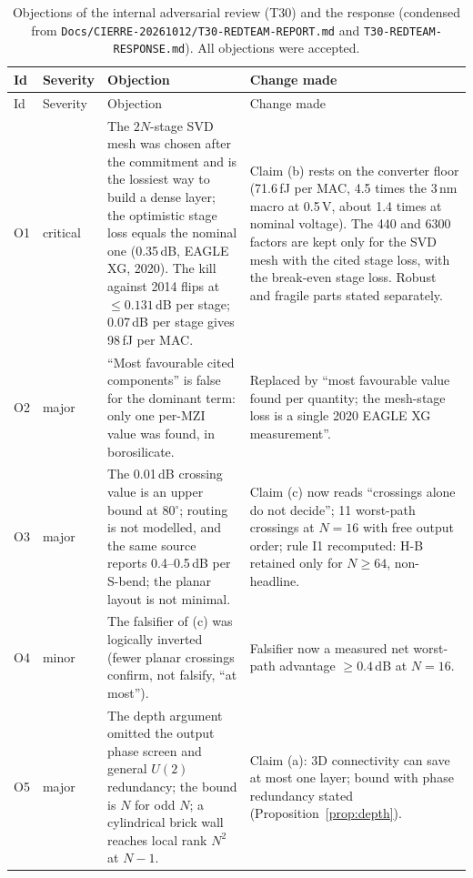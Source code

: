\documentclass[11pt,a4paper]{article}
\newcommand{\dB}{\,dB\xspace}
\newcommand{\fJ}{\,fJ\xspace}
\begin{document}
\begingroup\scriptsize
\setlength{\tabcolsep}{3pt}
\begin{longtable}{@{}l>{\raggedright\arraybackslash}p{1.15cm}>{\raggedright\arraybackslash}p{6.4cm}>{\raggedright\arraybackslash}p{6.6cm}@{}}
\caption{Objections of the internal adversarial review (T30) and the response (condensed from \texttt{Docs/CIERRE-20261012/T30-REDTEAM-REPORT.md} and \texttt{T30-REDTEAM-RESPONSE.md}). All objections were accepted.}\label{tab:objections}\\
\toprule Id & Severity & Objection & Change made \\ \midrule \endfirsthead
\toprule Id & Severity & Objection & Change made \\ \midrule \endhead
\bottomrule \endfoot
O1 & critical & The $2N$-stage SVD mesh was chosen after the commitment and is the lossiest way to build a dense layer; the optimistic stage loss equals the nominal one (0.35\dB, EAGLE XG, 2020). The kill against 2014 flips at $\le0.131$\dB per stage; 0.07\dB per stage gives 98\fJ per MAC. & Claim (b) rests on the converter floor (71.6\fJ per MAC, 4.5 times the 3\,nm macro at 0.5\,V, about 1.4 times at nominal voltage). The 440 and 6300 factors are kept only for the SVD mesh with the cited stage loss, with the break-even stage loss. Robust and fragile parts stated separately. \\
O2 & major & ``Most favourable cited components'' is false for the dominant term: only one per-MZI value was found, in borosilicate. & Replaced by ``most favourable value found per quantity; the mesh-stage loss is a single 2020 EAGLE XG measurement''. \\
O3 & major & The 0.01\dB crossing value is an upper bound at 80$^\circ$; routing is not modelled, and the same source reports 0.4--0.5\dB per S-bend; the planar layout is not minimal. & Claim (c) now reads ``crossings alone do not decide''; 11 worst-path crossings at $N=16$ with free output order; rule I1 recomputed: H-B retained only for $N\ge64$, non-headline. \\
O4 & minor & The falsifier of (c) was logically inverted (fewer planar crossings confirm, not falsify, ``at most''). & Falsifier now a measured net worst-path advantage $\ge0.4$\dB at $N=16$. \\
O5 & major & The depth argument omitted the output phase screen and general $U(2)$ redundancy; the bound is $N$ for odd $N$; a cylindrical brick wall reaches local rank $N^2$ at $N-1$. & Claim (a): 3D connectivity can save at most one layer; bound with phase redundancy stated (Proposition~\ref{prop:depth}). \\

\end{longtable}
\end{document}
